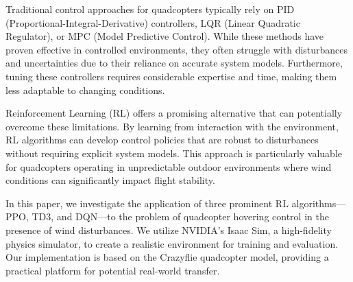 \documentclass[12pt]{article}
\begin{document}

Traditional control approaches for quadcopters typically rely on PID (Proportional-Integral-Derivative) controllers, LQR (Linear Quadratic Regulator), or MPC (Model Predictive Control). While these methods have proven effective in controlled environments, they often struggle with disturbances and uncertainties due to their reliance on accurate system models. Furthermore, tuning these controllers requires considerable expertise and time, making them less adaptable to changing conditions.


Reinforcement Learning (RL) offers a promising alternative that can potentially overcome these limitations. By learning from interaction with the environment, RL algorithms can develop control policies that are robust to disturbances without requiring explicit system models. This approach is particularly valuable for quadcopters operating in unpredictable outdoor environments where wind conditions can significantly impact flight stability.


In this paper, we investigate the application of three prominent RL algorithms—PPO, TD3, and DQN—to the problem of quadcopter hovering control in the presence of wind disturbances. We utilize NVIDIA's Isaac Sim, a high-fidelity physics simulator, to create a realistic environment for training and evaluation. Our implementation is based on the Crazyflie quadcopter model, providing a practical platform for potential real-world transfer.

\end{document}
